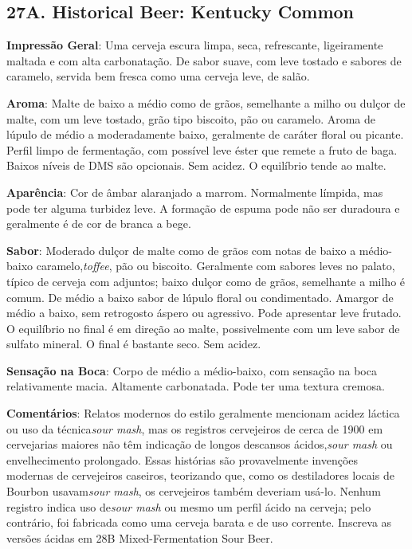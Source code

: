 \subsection*{27A. Historical Beer: Kentucky Common}
\textbf{Impressão Geral}: Uma cerveja escura limpa, seca, refrescante, ligeiramente maltada e com alta carbonatação. De sabor suave, com leve tostado e sabores de caramelo, servida bem fresca como uma cerveja leve, de salão.

\textbf{Aroma}: Malte de baixo a médio como de grãos, semelhante a milho ou dulçor de malte, com um leve tostado, grão tipo biscoito, pão ou caramelo. Aroma de lúpulo de médio a moderadamente baixo, geralmente de caráter floral ou picante. Perfil limpo de fermentação, com possível leve éster que remete a fruto de baga. Baixos níveis de DMS são opcionais. Sem acidez. O equilíbrio tende ao malte.

\textbf{Aparência}: Cor de âmbar alaranjado a marrom. Normalmente límpida, mas pode ter alguma turbidez leve. A formação de espuma pode não ser duradoura e geralmente é de cor de branca a bege.

\textbf{Sabor}: Moderado dulçor de malte como de grãos com notas de baixo a médio-baixo caramelo,\textit{toffee}, pão ou biscoito. Geralmente com sabores leves no palato, típico de cerveja com adjuntos; baixo dulçor como de grãos, semelhante a milho é comum. De médio a baixo sabor de lúpulo floral ou condimentado. Amargor de médio a baixo, sem retrogosto áspero ou agressivo. Pode apresentar leve frutado. O equilíbrio no final é em direção ao malte, possivelmente com um leve sabor de sulfato mineral. O final é bastante seco. Sem acidez.

\textbf{Sensação na Boca}: Corpo de médio a médio-baixo, com sensação na boca relativamente macia. Altamente carbonatada. Pode ter uma textura cremosa.

\textbf{Comentários}: Relatos modernos do estilo geralmente mencionam acidez láctica ou uso da técnica\textit{sour mash}, mas os registros cervejeiros de cerca de 1900 em cervejarias maiores não têm indicação de longos descansos ácidos,\textit{sour mash} ou envelhecimento prolongado. Essas histórias são provavelmente invenções modernas de cervejeiros caseiros, teorizando que, como os destiladores locais de Bourbon usavam\textit{sour mash}, os cervejeiros também deveriam usá-lo. Nenhum registro indica uso de\textit{sour mash} ou mesmo um perfil ácido na cerveja; pelo contrário, foi fabricada como uma cerveja barata e de uso corrente. Inscreva as versões ácidas em 28B Mixed-Fermentation Sour Beer.

